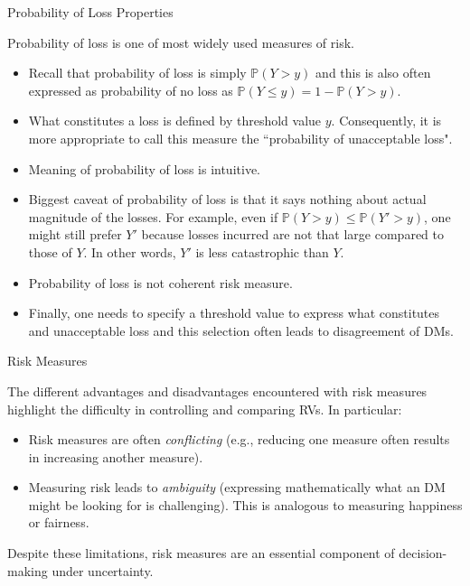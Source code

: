 \documentclass[9pt]{beamer}
\begin{document}
%
\begin{frame}{Probability of Loss Properties}


Probability of loss is one of most widely used measures of risk.  

\begin{itemize}

\item Recall that probability of loss is simply $\mathbb{P}(Y>y)$ and this is also often expressed as probability of no loss as $\mathbb{P}(Y\leq y)=1-\mathbb{P}(Y>y)$. 

\item What constitutes a loss is defined by threshold value $y$. Consequently, it is more appropriate to call this measure the  ``probability of unacceptable loss". 

\item Meaning of probability of loss is intuitive. 

\item Biggest caveat of probability of loss is that it says nothing about actual magnitude of the losses.  For example, even if $\mathbb{P}(Y>y)\leq \mathbb{P}(Y'>y)$, one might still prefer $Y'$ because losses incurred are not that large compared to those of $Y$.  In other words, $Y'$ is less catastrophic than $Y$. 

\item Probability of loss is not coherent risk measure. 

\item Finally, one needs to specify a threshold value to express what constitutes and unacceptable loss and this selection often leads to disagreement of DMs.

\end{itemize}

\end{frame}

%
\begin{frame}{Risk Measures}

The different advantages and disadvantages encountered with risk measures highlight the difficulty in controlling and comparing RVs. In particular:

\begin{itemize}
\item Risk measures are often {\em conflicting} (e.g., reducing one measure often results in increasing another measure). 
\item Measuring risk leads to {\em ambiguity} (expressing mathematically what an DM might be looking for is challenging). This is analogous to measuring happiness or fairness. 
\end{itemize}
Despite these limitations, risk measures are an essential component of decision-making under uncertainty.

\end{frame}
\end{document}
